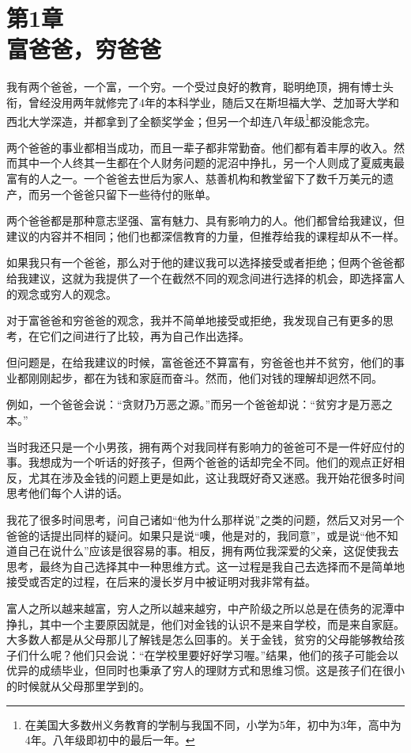 \section[第1章\q 富爸爸，穷爸爸]{第1章\\富爸爸，穷爸爸}

我有两个爸爸，一个富，一个穷。一个受过良好的教育，聪明绝顶，拥有博士头衔，曾经没用两年就修完了4年的本科学业，随后又在斯坦福大学、芝加哥大学和西北大学深造，并都拿到了全额奖学金；但另一个却连八年级\footnote{在美国大多数州义务教育的学制与我国不同，小学为5年，初中为3年，高中为4年。八年级即初中的最后一年。}都没能念完。

两个爸爸的事业都相当成功，而且一辈子都非常勤奋。他们都有着丰厚的收入。然而其中一个人终其一生都在个人财务问题的泥沼中挣扎，另一个人则成了夏威夷最富有的人之一。一个爸爸去世后为家人、慈善机构和教堂留下了数千万美元的遗产，而另一个爸爸只留下一些待付的账单。

两个爸爸都是那种意志坚强、富有魅力、具有影响力的人。他们都曾给我建议，但建议的内容并不相同；他们也都深信教育的力量，但推荐给我的课程却从不一样。

如果我只有一个爸爸，那么对于他的建议我可以选择接受或者拒绝；但两个爸爸都给我建议，这就为我提供了一个在截然不同的观念间进行选择的机会，即选择富人的观念或穷人的观念。

对于富爸爸和穷爸爸的观念，我并不简单地接受或拒绝，我发现自己有更多的思考，在它们之间进行了比较，再为自己作出选择。

但问题是，在给我建议的时候，富爸爸还不算富有，穷爸爸也并不贫穷，他们的事业都刚刚起步，都在为钱和家庭而奋斗。然而，他们对钱的理解却迥然不同。

例如，一个爸爸会说：“贪财乃万恶之源。”而另一个爸爸却说：“贫穷才是万恶之本。”

当时我还只是一个小男孩，拥有两个对我同样有影响力的爸爸可不是一件好应付的事。我想成为一个听话的好孩子，但两个爸爸的话却完全不同。他们的观点正好相反，尤其在涉及金钱的问题上更是如此，这让我既好奇又迷惑。我开始花很多时间思考他们每个人讲的话。

我花了很多时间思考，问自己诸如“他为什么那样说”之类的问题，然后又对另一个爸爸的话提出同样的疑问。如果只是说“噢，他是对的，我同意”，或是说“他不知道自己在说什么”应该是很容易的事。相反，拥有两位我深爱的父亲，这促使我去思考，最终为自己选择其中一种思维方式。这一过程是我自己去选择而不是简单地接受或否定的过程，在后来的漫长岁月中被证明对我非常有益。

富人之所以越来越富，穷人之所以越来越穷，中产阶级之所以总是在债务的泥潭中挣扎，其中一个主要原因就是，他们对金钱的认识不是来自学校，而是来自家庭。大多数人都是从父母那儿了解钱是怎么回事的。关于金钱，贫穷的父母能够教给孩子们什么呢？他们只会说：“在学校里要好好学习喔。”结果，他们的孩子可能会以优异的成绩毕业，但同时也秉承了穷人的理财方式和思维习惯。这是孩子们在很小的时候就从父母那里学到的。

